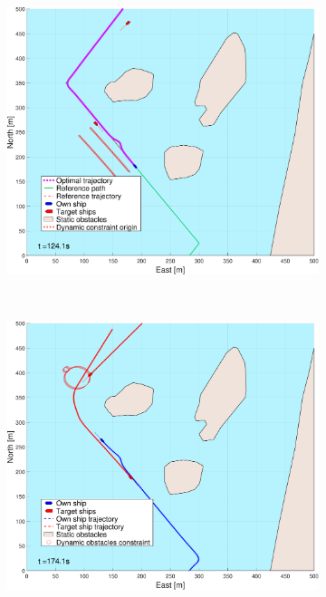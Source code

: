 \begin{figure}[!ht]
    \hfill
    \begin{subfigure}[b]{0.494\textwidth}
        \centering
        \includegraphics[width=\textwidth]{Images/NewFigures/Helloya/_Simple_0fig999_time=125}
        \subcaption{}
    \end{subfigure}
    \hfill
    \\\begin{subfigure}[b]{0.494\textwidth}
        \centering
        \includegraphics[width=\textwidth]{Images/NewFigures/Helloya/_Simple_0fig1_time=175}

\end{subfigure}
\end{figure}
